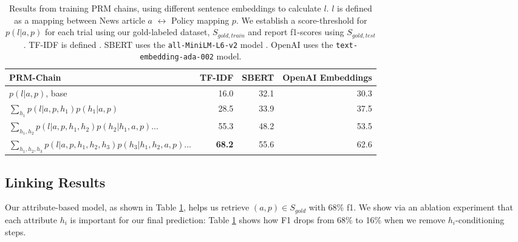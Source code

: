 \documentclass[11pt]{article}
\begin{document}
\begin{table}
    \centering
    \begin{tabularx}{\linewidth}{Xrrr}
    \toprule
    PRM-Chain & TF-IDF  & SBERT & OpenAI Embeddings\\
    \midrule
    $p(l | a, p)$, base & 16.0 & 32.1 & 30.3 \\ 
    $\sum_{h_1} p(l | a, p, h_1) p(h_1 | a, p)$ & 28.5 & 33.9  & 37.5 \\ 
    $\sum_{h_1, h_2} p(l | a, p, h_1, h_2) p(h_2 | h_1, a, p)...$ & 55.3 & 48.2 & 53.5 \\
    $\sum_{h_1, h_2, h_3} p(l | a, p, h_1, h_2, h_3) p(h_3 | h_1, h_2, a, p)...$ & \textbf{68.2} & 55.6 & 62.6 \\
    \bottomrule
    \end{tabularx}
    \caption{Results from training PRM chains, using different sentence embeddings to calculate $l$. $l$ is defined as a mapping between News article $a$ $\leftrightarrow$ Policy mapping $p$. We establish a score-threshold for $p(l | a, p)$ for each trial using our gold-labeled dataset, $S_{gold, train}$ and report f1-scores using $S_{gold, test}$. TF-IDF is defined . SBERT uses the \texttt{all-MiniLM-L6-v2} model \cite{reimers2019sentence}. OpenAI uses the \texttt{text-embedding-ada-002} model.}
    \label{tbl:part-1-results}
\end{table}

\subsection{Linking Results}
\label{sct:sct-1:results}

Our attribute-based model, as shown in Table \ref{tbl:part-1-results}, helps us retrieve $(a, p) \in S_{gold}$ with 68\% f1. We show via an ablation experiment that each attribute $h_i$ is important for our final prediction: Table \ref{tbl:part-1-results} shows how F1 drops from 68\% to 16\% when we remove $h_i$-conditioning steps.
\end{document}
